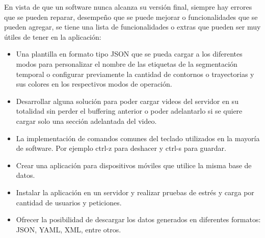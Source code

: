 En vista de que un software nunca alcanza su versión final, siempre hay errores que se pueden reparar, desempeño que se puede mejorar o funcionalidades que se pueden agregar, se tiene una lista de funcionalidades o extras que pueden ser muy útiles de tener en la aplicación:

\begin{itemize}
\item Una plantilla en formato tipo JSON que se pueda cargar a los diferentes modos para personalizar el nombre de las etiquetas de la segmentación temporal o configurar previamente la cantidad de contornos o trayectorias y sus colores en los respectivos modos de operación.

\item Desarrollar alguna solución para poder cargar videos del servidor en su totalidad sin perder el buffering anterior o poder adelantarlo si se quiere cargar solo una sección adelantada del video.

\item La implementación de comandos comunes del teclado utilizados en la mayoría de software. Por ejemplo ctrl-z para deshacer y ctrl-s para guardar.

\item Crear una aplicación para dispositivos móviles que utilice la misma base de datos.

\item Instalar la aplicación en un servidor y realizar pruebas de estrés y carga por cantidad de usuarios y peticiones.

\item Ofrecer la posibilidad de descargar los datos generados en diferentes formatos: JSON, YAML, XML, entre otros.

\end{itemize}